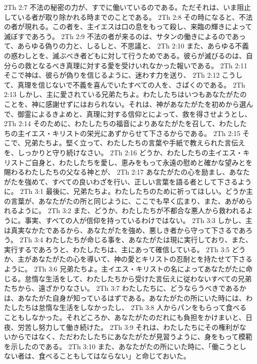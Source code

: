 2Th 2:7  不法の秘密の力が、すでに働いているのである。ただそれは、いま阻止している者が取り除かれる時までのことである。
2Th 2:8  その時になると、不法の者が現れる。この者を、主イエスは口の息をもって殺し、来臨の輝きによって滅ぼすであろう。
2Th 2:9  不法の者が来るのは、サタンの働きによるのであって、あらゆる偽りの力と、しるしと、不思議と、
2Th 2:10  また、あらゆる不義の惑わしとを、滅ぶべき者どもに対して行うためである。彼らが滅びるのは、自分らの救となるべき真理に対する愛を受けいれなかった報いである。
2Th 2:11  そこで神は、彼らが偽りを信じるように、迷わす力を送り、
2Th 2:12  こうして、真理を信じないで不義を喜んでいたすべての人を、さばくのである。
2Th 2:13  しかし、主に愛されている兄弟たちよ。わたしたちはいつもあなたがたのことを、神に感謝せずにはおられない。それは、神があなたがたを初めから選んで、御霊によるきよめと、真理に対する信仰とによって、救を得させようとし、
2Th 2:14  そのために、わたしたちの福音によりあなたがたを召して、わたしたちの主イエス・キリストの栄光にあずからせて下さるからである。
2Th 2:15  そこで、兄弟たちよ。堅く立って、わたしたちの言葉や手紙で教えられた言伝えを、しっかりと守り続けなさい。
2Th 2:16  どうか、わたしたちの主イエス・キリストご自身と、わたしたちを愛し、恵みをもって永遠の慰めと確かな望みとを賜わるわたしたちの父なる神とが、
2Th 2:17  あなたがたの心を励まし、あなたがたを強めて、すべての良いわざを行い、正しい言葉を語る者として下さるように。
2Th 3:1  最後に、兄弟たちよ。わたしたちのために祈ってほしい。どうか主の言葉が、あなたがたの所と同じように、ここでも早く広まり、また、あがめられるように。
2Th 3:2  また、どうか、わたしたちが不都合な悪人から救われるように。事実、すべての人が信仰を持っているわけではない。
2Th 3:3  しかし、主は真実なかたであるから、あなたがたを強め、悪しき者から守って下さるであろう。
2Th 3:4  わたしたちが命じる事を、あなたがたは現に実行しており、また、実行するであろうと、わたしたちは、主にあって確信している。
2Th 3:5  どうか、主があなたがたの心を導いて、神の愛とキリストの忍耐とを持たせて下さるように。
2Th 3:6  兄弟たちよ。主イエス・キリストの名によってあなたがたに命じる。怠惰な生活をして、わたしたちから受けた言伝えに従わないすべての兄弟たちから、遠ざかりなさい。
2Th 3:7  わたしたちに、どうならうべきであるかは、あなたがた自身が知っているはずである。あなたがたの所にいた時には、わたしたちは怠惰な生活をしなかったし、
2Th 3:8  人からパンをもらって食べることもしなかった。それどころか、あなたがたのだれにも負担をかけまいと、日夜、労苦し努力して働き続けた。
2Th 3:9  それは、わたしたちにその権利がないからではなく、ただわたしたちにあなたがたが見習うように、身をもって模範を示したのである。
2Th 3:10  また、あなたがたの所にいた時に、「働こうとしない者は、食べることもしてはならない」と命じておいた。
